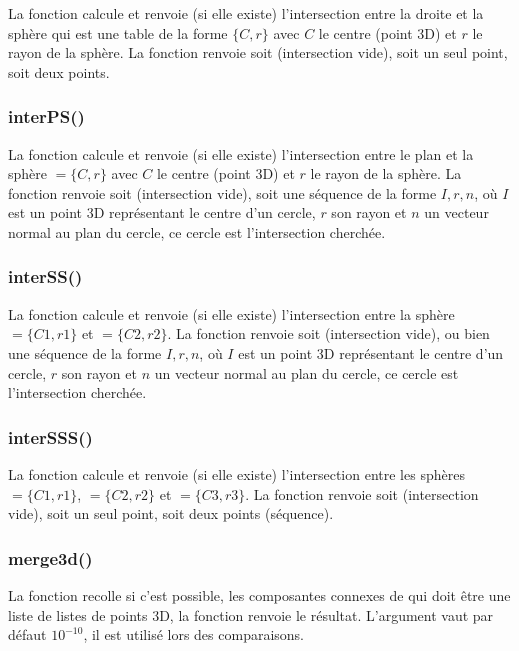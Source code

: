 La fonction  calcule et renvoie (si elle existe) l'intersection entre la droite  et la sphère  qui est une table de la forme $\{C,r\}$ avec $C$ le centre (point 3D) et $r$ le rayon de la sphère. La fonction renvoie soit \nil (intersection vide), soit un seul point, soit deux points.

\subsubsection{interPS()}

La fonction  calcule et renvoie (si elle existe) l'intersection entre le plan  et la sphère $=\{C,r\}$ avec $C$ le centre (point 3D) et $r$ le rayon de la sphère. La fonction renvoie soit \nil (intersection vide), soit une séquence de la forme $I,r,n$, où $I$ est un point 3D représentant le centre d'un cercle, $r$ son rayon et $n$ un vecteur normal au plan du cercle, ce cercle est l'intersection cherchée. 

\subsubsection{interSS()}

La fonction  calcule et renvoie (si elle existe) l'intersection entre la sphère $=\{C1,r1\}$ et $=\{C2,r2\}$. La fonction renvoie soit \nil (intersection vide), ou bien une séquence de la forme $I,r,n$, où $I$ est un point 3D représentant le centre d'un cercle, $r$ son rayon et $n$ un vecteur normal au plan du cercle, ce cercle est l'intersection cherchée. 

\subsubsection{interSSS()}

La fonction  calcule et renvoie (si elle existe) l'intersection entre les sphères $=\{C1,r1\}$, $=\{C2,r2\}$ et $=\{C3,r3\}$. La fonction renvoie soit \nil (intersection vide), soit un seul point, soit deux points (séquence).


\subsubsection{merge3d()}

La fonction  recolle si c'est possible, les composantes connexes de  qui doit être une liste de listes de points 3D, la fonction renvoie le résultat. L'argument  vaut par défaut $10^{-10}$, il est utilisé lors des comparaisons.

